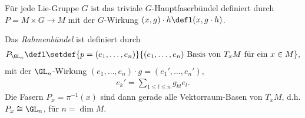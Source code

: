 \documentclass[%
	paper=a5,%
	fleqn,%
	DIV=18,%
	BCOR=0mm,
	fontsize=11pt,
	titlepage=false,%
	bibliography=totoc,
	DIV=18,%
	twoside=true,
	pdftitle=Riemannsche Geometrie,
	pdfauthor=Uwe Semmelmann,
	numbers=noendperiod]%
	{scrbook}
\begin{document}
\begin{ex}
\begin{exenum}
\item Für jede Lie-Gruppe $G$ ist das triviale $G$-Hauptfaserbündel definiert
durch $P=M\times G\to M$ mit der $G$-Wirkung $(x,g)\cdot h\defl (x,g\cdot h)$.
\item {}
Das \textit{Rahmenbündel} ist definiert durch
\begin{align*}
P_{\GL_n} \defl \setdef{ p= (e_1,\ldots,e_n)}{(e_1,\ldots,e_n)\text{ Basis von
}T_xM\text{ für ein }x\in M},
\end{align*} 
mit der $\GL_n$-Wirkung $(e_1,\ldots,e_n)\cdot g = (e_1',\ldots,e_n')$,
\begin{align*}
e_k' = \sum_{1\le l\le n} g_{kl}e_l.
\end{align*}
Die Fasern $P_x = \pi^{-1}(x)$ sind dann gerade alle Vektorraum-Basen von
$T_xM$, d.h. $P_x \cong \GL_n$, für $n= \dim M$.


\end{exenum}
\end{ex}
\end{document}
